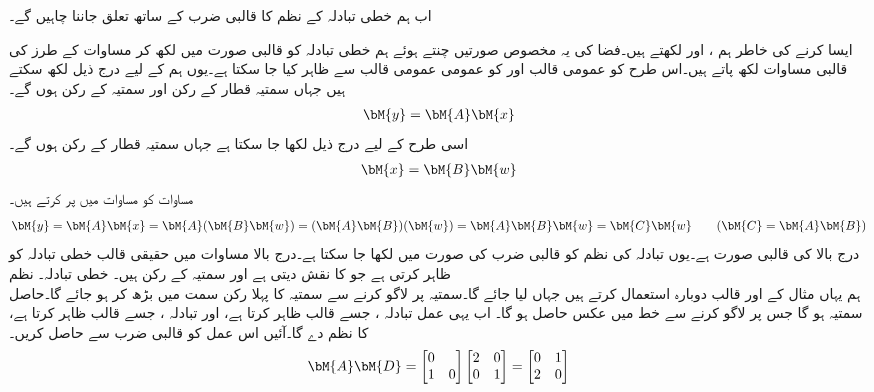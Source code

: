 اب ہم خطی تبادلہ کے نظم کا قالبی ضرب کے ساتھ تعلق جاننا چاہیں گے۔

ایسا کرنے کی خاطر ہم ،  اور  لکھتے ہیں۔فضا کی یہ مخصوص صورتیں چنتے ہوئے ہم خطی تبادلہ کو قالبی صورت میں لکھ  کر مساوات  کے طرز کی  قالبی مساوات لکھ پاتے ہیں۔اس طرح  کو  عمومی قالب 
 اور  کو عمومی  عمومی قالب  سے ظاہر کیا جا سکتا ہے۔یوں ہم  کے لیے درج ذیل لکھ سکتے ہیں جہاں سمتیہ قطار  کے  رکن اور سمتیہ  کے  رکن ہوں گے۔
\begin{align}\label{مساوات_الجبرا_نظم_استعمال_الف}
\bM{y}=\bM{A}\bM{x}
\end{align}
اسی طرح  کے لیے درج ذیل لکھا جا سکتا ہے جہاں سمتیہ قطار  کے  رکن ہوں گے۔
\begin{align}\label{مساوات_الجبرا_نظم_استعمال_ب}
\bM{x}=\bM{B}\bM{w}
\end{align}
مساوات  کو مساوات  میں پر کرتے ہیں۔
\begin{align}\label{مساوات_الجبرا_نظم_کی_تعریف}
\bM{y}=\bM{A}\bM{x}=\bM{A}(\bM{B}\bM{w})=(\bM{A}\bM{B})(\bM{w})=\bM{A}\bM{B}\bM{w}=\bM{C}\bM{w}\quad\quad  (\bM{C}=\bM{A}\bM{B})
\end{align}
درج بالا   کی قالبی صورت ہے۔یوں تبادلہ کی نظم کو قالبی ضرب کی صورت میں لکھا جا سکتا ہے۔درج بالا مساوات میں حقیقی  قالب  خطی تبادلہ  کو ظاہر کرتی ہے جو  کا نقش  دیتی ہے اور سمتیہ  کے  رکن ہیں۔
\quad خطی تبادلہ۔ نظم\\
ہم یہاں مثال  کے  اور  قالب دوبارہ استعمال کرتے ہیں جہاں  لیا جائے گا۔سمتیہ  پر  لاگو کرنے سے  سمتیہ کا پہلا رکن  سمت میں بڑھ کر   ہو جائے گا۔حاصل سمتیہ  ہو گا جس پر  لاگو کرنے سے خط  میں عکس  حاصل ہو گا۔ اب یہی عمل تبادلہ ، جسے قالب  ظاہر کرتا ہے،  اور تبادلہ ، جسے  قالب  ظاہر کرتا ہے، کا نظم  دے گا۔آئیں اس عمل کو قالبی ضرب سے حاصل کریں۔
\begin{align*}
\bM{A}\bM{D}=\begin{bmatrix*}[r]0&\\1&0  \end{bmatrix*} \begin{bmatrix*}[r] 2&0\\0&1 \end{bmatrix*}=\begin{bmatrix*}[r] 0&1\\2&0 \end{bmatrix*}
\end{align*}
